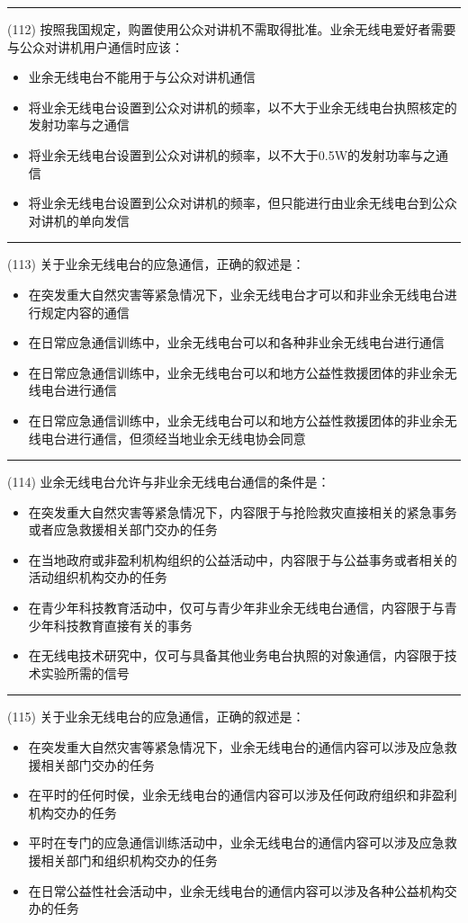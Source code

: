 \documentclass[twocolumn]{ctexart}  %
\begin{document}
\noindent\rule{0.5\textwidth}{1pt}
\heiti (112) 按照我国规定，购置使用公众对讲机不需取得批准。业余无线电爱好者需要与公众对讲机用户通信时应该： \songti {\color{gray} [LK1010] }
\begin{itemize}
	\item  业余无线电台不能用于与公众对讲机通信
	\item  将业余无线电台设置到公众对讲机的频率，以不大于业余无线电台执照核定的发射功率与之通信
	\item  将业余无线电台设置到公众对讲机的频率，以不大于0.5W的发射功率与之通信
	\item  将业余无线电台设置到公众对讲机的频率，但只能进行由业余无线电台到公众对讲机的单向发信
\end{itemize}


\noindent\rule{0.5\textwidth}{1pt}
\heiti (113) 关于业余无线电台的应急通信，正确的叙述是： \songti {\color{gray} [LK0053] }
\begin{itemize}
	\item  在突发重大自然灾害等紧急情况下，业余无线电台才可以和非业余无线电台进行规定内容的通信
	\item  在日常应急通信训练中，业余无线电台可以和各种非业余无线电台进行通信
	\item  在日常应急通信训练中，业余无线电台可以和地方公益性救援团体的非业余无线电台进行通信
	\item  在日常应急通信训练中，业余无线电台可以和地方公益性救援团体的非业余无线电台进行通信，但须经当地业余无线电协会同意
\end{itemize}


\noindent\rule{0.5\textwidth}{1pt}
\heiti (114) 业余无线电台允许与非业余无线电台通信的条件是： \songti {\color{gray} [LK0054] }
\begin{itemize}
	\item  在突发重大自然灾害等紧急情况下，内容限于与抢险救灾直接相关的紧急事务或者应急救援相关部门交办的任务
	\item  在当地政府或非盈利机构组织的公益活动中，内容限于与公益事务或者相关的活动组织机构交办的任务
	\item  在青少年科技教育活动中，仅可与青少年非业余无线电台通信，内容限于与青少年科技教育直接有关的事务
	\item  在无线电技术研究中，仅可与具备其他业务电台执照的对象通信，内容限于技术实验所需的信号
\end{itemize}


\noindent\rule{0.5\textwidth}{1pt}
\heiti (115) 关于业余无线电台的应急通信，正确的叙述是： \songti {\color{gray} [LK0055] }
\begin{itemize}
	\item  在突发重大自然灾害等紧急情况下，业余无线电台的通信内容可以涉及应急救援相关部门交办的任务
	\item  在平时的任何时侯，业余无线电台的通信内容可以涉及任何政府组织和非盈利机构交办的任务
	\item  平时在专门的应急通信训练活动中，业余无线电台的通信内容可以涉及应急救援相关部门和组织机构交办的任务
	\item  在日常公益性社会活动中，业余无线电台的通信内容可以涉及各种公益机构交办的任务
\end{itemize}
\end{document}
